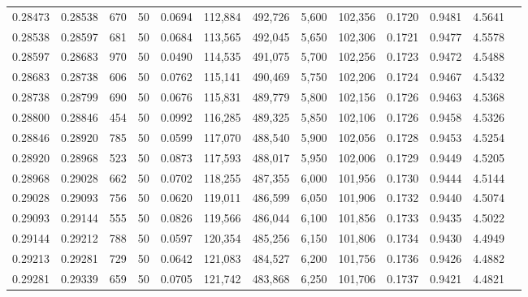 \begin{tabular}{rrrrrrrrrrrrr}
0.28473 & 0.28538 &   670 &  50 &                                     0.0694 & 112,884 & 492,726 &   5,600 & 102,356 & 0.1720 & 0.9481 & 4.5641 \\
0.28538 & 0.28597 &   681 &  50 &                                     0.0684 & 113,565 & 492,045 &   5,650 & 102,306 & 0.1721 & 0.9477 & 4.5578 \\
0.28597 & 0.28683 &   970 &  50 &                                     0.0490 & 114,535 & 491,075 &   5,700 & 102,256 & 0.1723 & 0.9472 & 4.5488 \\
0.28683 & 0.28738 &   606 &  50 &                                     0.0762 & 115,141 & 490,469 &   5,750 & 102,206 & 0.1724 & 0.9467 & 4.5432 \\
0.28738 & 0.28799 &   690 &  50 &                                     0.0676 & 115,831 & 489,779 &   5,800 & 102,156 & 0.1726 & 0.9463 & 4.5368 \\
0.28800 & 0.28846 &   454 &  50 &                                     0.0992 & 116,285 & 489,325 &   5,850 & 102,106 & 0.1726 & 0.9458 & 4.5326 \\
0.28846 & 0.28920 &   785 &  50 &                                     0.0599 & 117,070 & 488,540 &   5,900 & 102,056 & 0.1728 & 0.9453 & 4.5254 \\
0.28920 & 0.28968 &   523 &  50 &                                     0.0873 & 117,593 & 488,017 &   5,950 & 102,006 & 0.1729 & 0.9449 & 4.5205 \\
0.28968 & 0.29028 &   662 &  50 &                                     0.0702 & 118,255 & 487,355 &   6,000 & 101,956 & 0.1730 & 0.9444 & 4.5144 \\
0.29028 & 0.29093 &   756 &  50 &                                     0.0620 & 119,011 & 486,599 &   6,050 & 101,906 & 0.1732 & 0.9440 & 4.5074 \\
0.29093 & 0.29144 &   555 &  50 &                                     0.0826 & 119,566 & 486,044 &   6,100 & 101,856 & 0.1733 & 0.9435 & 4.5022 \\
0.29144 & 0.29212 &   788 &  50 &                                     0.0597 & 120,354 & 485,256 &   6,150 & 101,806 & 0.1734 & 0.9430 & 4.4949 \\
0.29213 & 0.29281 &   729 &  50 &                                     0.0642 & 121,083 & 484,527 &   6,200 & 101,756 & 0.1736 & 0.9426 & 4.4882 \\
0.29281 & 0.29339 &   659 &  50 &                                     0.0705 & 121,742 & 483,868 &   6,250 & 101,706 & 0.1737 & 0.9421 & 4.4821 \\

\end{tabular}

